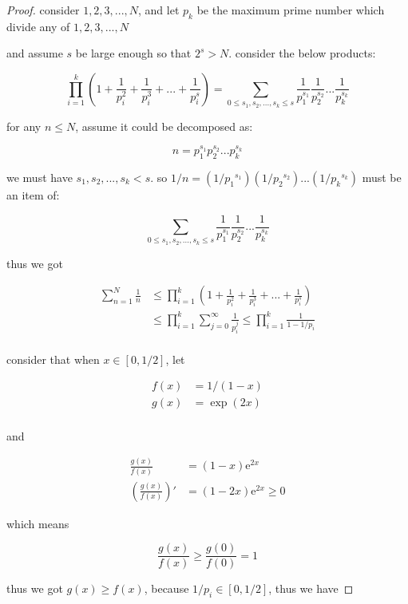 \begin{proof}
    consider $1,2,3,...,N$, and let $p_k$ be the maximum prime number which divide any of $1,2,3,...,N$ 

    and assume $s$ be large enough so that $2^s > N$. consider the below products:

    \[
        \prod_{i=1}^{k}(1+ \frac{1}{p_i^2} + \frac{1}{p_i^3} + ... +\frac{1}{p_i^s}) = \sum_{0 \le s_1,s_2,...,s_k \le s} \frac{1}{p_1^{s_1}} \frac{1}{p_2^{s_2}} ... \frac{1}{p_k^{s_k}}
    \]

    for any $n \le N$, assume it could be decomposed as:

    \[
        n = p_1^{s_1}p_2^{s_2} ... p_k^{s_k}
    \]

    we must have $s_1, s_2,...,s_k < s$. so $1/n = (1/{p_1}^{s_1}) (1/{p_2}^{s_2}) ... (1/{p_k}^{s_k})$ must be an item of:

    \[
        \sum_{0 \le s_1,s_2,...,s_k \le s} \frac{1}{p_1^{s_1}} \frac{1}{p_2^{s_2}} ... \frac{1}{p_k^{s_k}}
    \]

    thus we got

    \begin{align*}
        \sum_{n=1}^{N}\frac{1}{n} &\le \prod_{i=1}^{k}(1+ \frac{1}{p_i^2} + \frac{1}{p_i^3} + ... +\frac{1}{p_i^s})  \\
        &\le \prod_{i=1}^{k}\sum_{j=0}^{\infty}\frac{1}{p_i^j} \le \prod_{i=1}^{k}\frac{1}{1-1/p_i} \\
    \end{align*}

    consider that when $x \in [0,1/2]$, let 

    \begin{align*}
        f(x) &= 1/(1-x) \\
        g(x) &= \exp (2x) \\
    \end{align*}

    and

    \begin{align*}
        \frac{g(x)}{f(x)} &= (1-x)\mathrm{e}^{2x} \\
        \left(\frac{g(x)}{f(x)}\right)' &= (1-2x) \mathrm{e}^{2x} \ge 0
    \end{align*}

    which means 

    \[
        \frac{g(x)}{f(x)} \ge \frac{g(0)}{f(0)} = 1
    \]

    thus we got $g(x) \ge f(x)$, because $1/p_i \in [0,1/2]$, thus we have


\end{proof}

